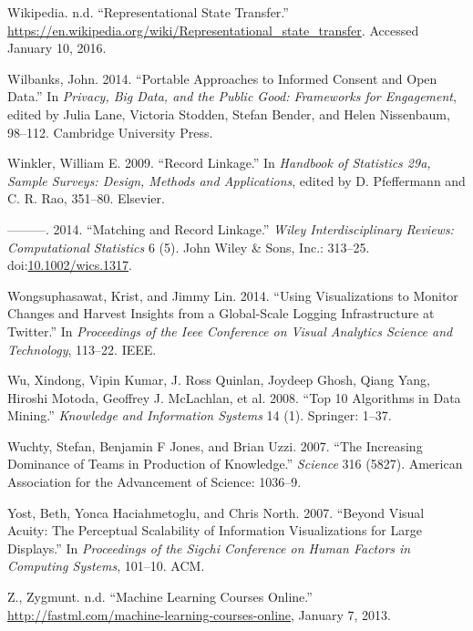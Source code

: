 \documentclass[]{krantz}
\begin{document}
\hypertarget{ref-RESTwiki}{}
Wikipedia. n.d. ``Representational State Transfer.''
\url{https://en.wikipedia.org/wiki/Representational_state_transfer}.
Accessed January 10, 2016.

\hypertarget{ref-Wilbanks2014}{}
Wilbanks, John. 2014. ``Portable Approaches to Informed Consent and Open
Data.'' In \emph{Privacy, Big Data, and the Public Good: Frameworks for
Engagement}, edited by Julia Lane, Victoria Stodden, Stefan Bender, and
Helen Nissenbaum, 98--112. Cambridge University Press.

\hypertarget{ref-winkler09}{}
Winkler, William E. 2009. ``Record Linkage.'' In \emph{Handbook of
Statistics 29a, Sample Surveys: Design, Methods and Applications},
edited by D. Pfeffermann and C. R. Rao, 351--80. Elsevier.

\hypertarget{ref-WICS:WICS1317}{}
---------. 2014. ``Matching and Record Linkage.'' \emph{Wiley
Interdisciplinary Reviews: Computational Statistics} 6 (5). John Wiley
\& Sons, Inc.: 313--25.
doi:\href{https://doi.org/10.1002/wics.1317}{10.1002/wics.1317}.

\hypertarget{ref-wongsuphasawat2014using}{}
Wongsuphasawat, Krist, and Jimmy Lin. 2014. ``Using Visualizations to
Monitor Changes and Harvest Insights from a Global-Scale Logging
Infrastructure at Twitter.'' In \emph{Proceedings of the Ieee Conference
on Visual Analytics Science and Technology}, 113--22. IEEE.

\hypertarget{ref-wu2008top}{}
Wu, Xindong, Vipin Kumar, J. Ross Quinlan, Joydeep Ghosh, Qiang Yang,
Hiroshi Motoda, Geoffrey J. McLachlan, et al. 2008. ``Top 10 Algorithms
in Data Mining.'' \emph{Knowledge and Information Systems} 14 (1).
Springer: 1--37.

\hypertarget{ref-wuchty2007increasing}{}
Wuchty, Stefan, Benjamin F Jones, and Brian Uzzi. 2007. ``The Increasing
Dominance of Teams in Production of Knowledge.'' \emph{Science} 316
(5827). American Association for the Advancement of Science: 1036--9.

\hypertarget{ref-yost2007beyond}{}
Yost, Beth, Yonca Haciahmetoglu, and Chris North. 2007. ``Beyond Visual
Acuity: The Perceptual Scalability of Information Visualizations for
Large Displays.'' In \emph{Proceedings of the Sigchi Conference on Human
Factors in Computing Systems}, 101--10. ACM.

\hypertarget{ref-MLcourses}{}
Z., Zygmunt. n.d. ``Machine Learning Courses Online.''
\url{http://fastml.com/machine-learning-courses-online}, January 7,
2013.
\end{document}
